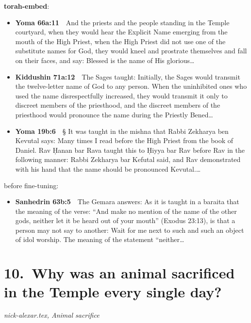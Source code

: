 \documentclass[11pt,a4paper]{article}
\begin{document}
{\color{quiet}\small\textbf{torah-embed}:}
\begin{itemize}[leftmargin=1.2em,itemsep=3pt]
\item {\color{ref}\textbf{Yoma 66a:11}}\ \ And the priests and the people standing in the Temple courtyard, when they would hear the Explicit Name emerging from the mouth of the High Priest, when the High Priest did not use one of the substitute names for God, they would kneel and prostrate themselves and fall on their faces, and say: Blessed is the name of His glorious\ldots
\item {\color{ref}\textbf{Kiddushin 71a:12}}\ \ The Sages taught: Initially, the Sages would transmit the twelve-letter name of God to any person. When the uninhibited ones who used the name disrespectfully increased, they would transmit it only to discreet members of the priesthood, and the discreet members of the priesthood would pronounce the name during the Priestly Bened\ldots
\item {\color{ref}\textbf{Yoma 19b:6}}\ \ § It was taught in the mishna that Rabbi Zekharya ben Kevutal says: Many times I read before the High Priest from the book of Daniel. Rav Ḥanan bar Rava taught this to Ḥiyya bar Rav before Rav in the following manner: Rabbi Zekharya bar Kefutal said, and Rav demonstrated with his hand that the name should be pronounced Kevutal.\ldots
\end{itemize}
{\color{quiet}\small before fine-tuning:}
\begin{itemize}[leftmargin=1.2em]
\item {\color{ref}\textbf{Sanhedrin 63b:5}}\ \ The Gemara answers: As it is taught in a baraita that the meaning of the verse: “And make no mention of the name of the other gods, neither let it be heard out of your mouth” (Exodus 23:13), is that a person may not say to another: Wait for me next to such and such an object of idol worship. The meaning of the statement “neither\ldots
\end{itemize}

\section*{10.\ Why was an animal sacrificed in the Temple every single day?}
{\color{quiet}\small\textit{nick-alexar.tex, Animal sacrifice}}
\end{document}
